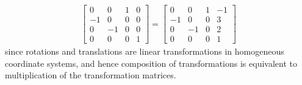 \documentclass[10pt]{article}
\begin{document}
\begin{enumerate}
\begin{align*}
\begin{bmatrix}
                0 & 0 & 1 & 0 \\
                -1 & 0 & 0 & 0 \\
                0 & -1 & 0 & 0 \\
                0 & 0 & 0 & 1
            \end{bmatrix} = \begin{bmatrix}
                0 & 0 & 1 & -1 \\
                -1 & 0 & 0 & 3 \\
                0 & -1 & 0 & 2 \\
                0 & 0 & 0 & 1
            \end{bmatrix}
        \end{align*}
        since rotations and translations are linear transformations in homogeneous
        coordinate systems, and hence composition of transformations is equivalent
        to multiplication of the transformation matrices.


\end{enumerate}
\end{document}
